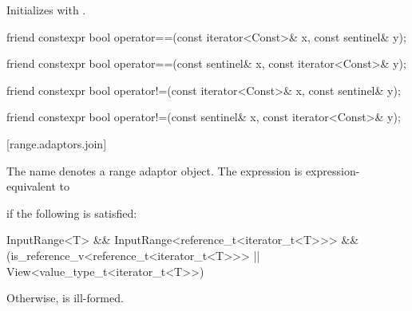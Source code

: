 {\begin{itemdescr}
\pnum
\effects Initializes  with .
\end{itemdescr}

\begin{itemdecl}
friend constexpr bool operator==(const iterator<Const>& x, const sentinel& y);
\end{itemdecl}

\begin{itemdescr}
\pnum
\oldtxt{\returns} 
\end{itemdescr}

\begin{itemdecl}
friend constexpr bool operator==(const sentinel& x, const iterator<Const>& y);
\end{itemdecl}

\begin{itemdescr}
\pnum
\oldtxt{\returns} 
\end{itemdescr}

\begin{itemdecl}
friend constexpr bool operator!=(const iterator<Const>& x, const sentinel& y);
\end{itemdecl}

\begin{itemdescr}
\pnum
\oldtxt{\returns} 
\end{itemdescr}

\begin{itemdecl}
friend constexpr bool operator!=(const sentinel& x, const iterator<Const>& y);
\end{itemdecl}

\begin{itemdescr}
\pnum
\oldtxt{\returns} 
\end{itemdescr}

[range.adaptors.join]{}

\pnum
The name  denotes a range adaptor
object.  The expression
  is
expression-equivalent to 
{\color{oldclr}
if the following is satisfied:
\begin{codeblock}
InputRange<T> &&
InputRange<reference_t<iterator_t<T>>> &&
(is_reference_v<reference_t<iterator_t<T>>> ||
 View<value_type_t<iterator_t<T>>)
\end{codeblock}
Otherwise,  is ill-formed.
} %

}

